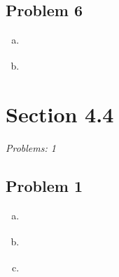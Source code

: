 \documentclass[12pt]{article}
\begin{document}
\subsection*{Problem 6}
\begin{enumerate}[a).]
    \item {
    }
    \item {
    }
\end{enumerate}

\section*{Section 4.4}
\textit{Problems: 1}
\subsection*{Problem 1}
\begin{enumerate}[a).]
    \item {
    }
    \item {
    }
    \item {
    }
\end{enumerate}
\end{document}

